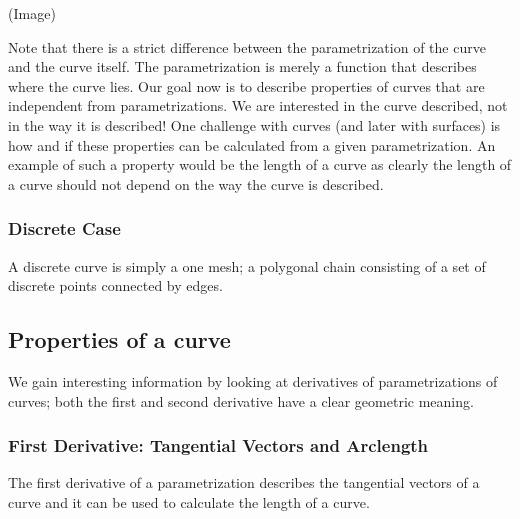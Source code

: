 	(Image)
	
	Note that there is a strict difference between the parametrization of the curve and the curve itself. The parametrization is merely a function that describes where the curve lies. Our goal now is to describe properties of curves that are independent from parametrizations. We are interested in the curve described, not in the way it is described! One challenge with curves (and later with surfaces) is how and if these properties can be calculated from a given parametrization. An example of such a property would be the length of a curve as clearly the length of a curve should not depend on the way the curve is described.
	
	\subsubsection*{Discrete Case}
	
	A discrete curve is simply a one mesh; a polygonal chain consisting of a set of discrete points connected by edges.	
	
	
	\subsection{Properties of a curve}
	
	We gain interesting information by looking at derivatives of parametrizations of curves; both the first and second derivative have a clear geometric meaning.
	
	\subsubsection*{First Derivative: Tangential Vectors and Arclength}
	
	The first derivative of a parametrization describes the tangential vectors of a curve and it can be used to calculate the length of a curve.
	
